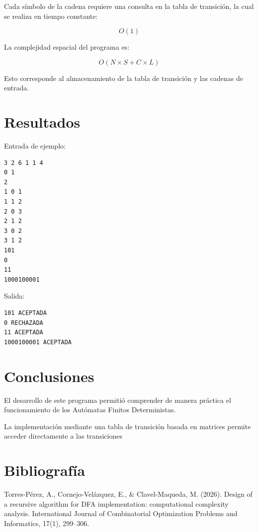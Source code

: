 \documentclass[12pt]{article}
\begin{document}
Cada símbolo de la cadena requiere una consulta en la tabla de transición, la cual se realiza en tiempo constante:

\[
O(1)
\]

La complejidad espacial del programa es:

\[
O(N \times S + C \times L)
\]

Esto corresponde al almacenamiento de la tabla de transición y las cadenas de entrada.

\section{Resultados}

Entrada de ejemplo:

\begin{verbatim}
3 2 6 1 1 4
0 1
2
1 0 1
1 1 2
2 0 3
2 1 2
3 0 2
3 1 2
101
0
11
1000100001
\end{verbatim}

Salida:

\begin{verbatim}
101 ACEPTADA
0 RECHAZADA
11 ACEPTADA
1000100001 ACEPTADA
\end{verbatim}

\newpage

\section{Conclusiones}

El desarrollo de este programa permitió comprender de manera práctica el funcionamiento de los Autómatas Finitos Deterministas.

La implementación mediante una tabla de transición basada en matrices permite acceder directamente a las transiciones

\section*{Bibliografía}

Torres-Pérez, A., Cornejo-Velázquez, E., \& Clavel-Maqueda, M. (2026). Design of a recursive algorithm for DFA implementation: computational complexity analysis. International Journal of Combinatorial Optimization Problems and Informatics, 17(1), 299–306.
\end{document}
